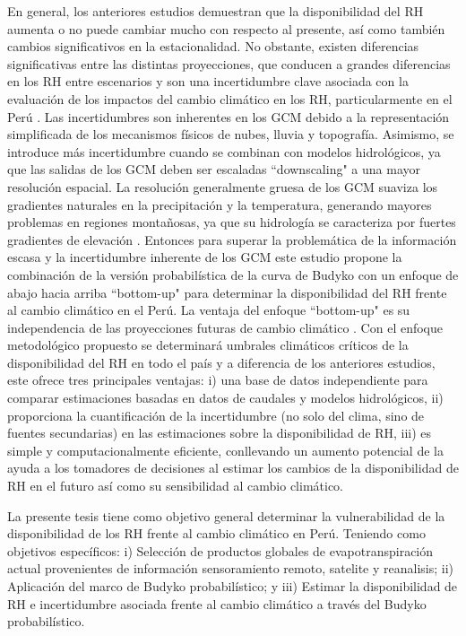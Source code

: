 \documentclass[12pt]{article}
\begin{document}
En general, los anteriores estudios demuestran que la disponibilidad del RH aumenta o no puede cambiar mucho con respecto al presente, así como también cambios significativos en la estacionalidad. No obstante, existen diferencias significativas entre las distintas proyecciones, que conducen a grandes diferencias en los RH entre escenarios \citep{Vuille2008} y son una incertidumbre clave asociada con la evaluación de los impactos del cambio climático en los RH, particularmente en el Perú \citep{VanSoesbergen2016}. Las incertidumbres son inherentes en los GCM debido a la representación simplificada de los mecanismos físicos de nubes, lluvia y topografía. Asimismo, se introduce más incertidumbre cuando se combinan con modelos hidrológicos, ya que las salidas de los GCM deben ser escaladas “downscaling" a una mayor resolución espacial. La resolución generalmente gruesa de los GCM suaviza los gradientes naturales en la precipitación y la temperatura, generando mayores problemas en regiones montañosas, ya que su hidrología se caracteriza por fuertes gradientes de elevación \citep{Buytaert2010}. Entonces para superar la problemática de la información escasa y la incertidumbre inherente de los GCM este estudio propone la combinación de la versión probabilística de la curva de Budyko \citep{Singh2015,Greve2015} con un enfoque de abajo hacia arriba ``bottom-up" para determinar la disponibilidad del RH frente al cambio climático en el Perú. La ventaja del enfoque ``bottom-up" es su independencia de las proyecciones futuras de cambio climático \citep{Singh2014,Poff2016}. Con el enfoque metodológico propuesto se determinará umbrales climáticos críticos de la disponibilidad del RH en todo el país y a diferencia de los anteriores estudios, este ofrece tres principales ventajas: i) una base de datos independiente para comparar estimaciones basadas en datos de caudales y modelos hidrológicos, ii) proporciona la cuantificación de la incertidumbre (no solo del clima, sino de fuentes secundarias) en las estimaciones sobre la disponibilidad de RH, iii) es simple y computacionalmente eficiente, conllevando un aumento potencial de la ayuda a los tomadores de decisiones al estimar los cambios de la disponibilidad de RH en el futuro así como su sensibilidad al cambio climático.

La presente tesis tiene como objetivo general determinar la vulnerabilidad de la disponibilidad de los RH frente al cambio climático en Perú. Teniendo como objetivos específicos: i) Selección de productos globales de evapotranspiración actual provenientes de información sensoramiento remoto, satelite y reanalisis; ii) Aplicación del marco de Budyko probabilístico; y iii) Estimar la disponibilidad de RH e incertidumbre asociada frente al cambio climático a través del Budyko probabilístico.
\end{document}
